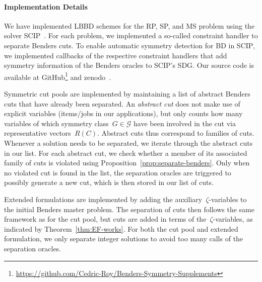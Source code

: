 \documentclass[a4paper,10pt]{article}
\newcommand{\solver}[1]{\textsc{#1}}
\newcommand{\scip}{\solver{SCIP}\xspace}
\newcommand{\rectanglepack}{RP\xspace}
\newcommand{\spherepack}{SP\xspace}
\newcommand{\scheduling}{MS\xspace}
\theoremstyle{definition}
\begin{document}
\paragraph{Implementation Details}
We have implemented LBBD schemes for the \rectanglepack, \spherepack, and \scheduling problem using the solver \scip~\cite{SCIP8}.
For each problem, we implemented a so-called constraint handler to separate Benders cuts.
To enable automatic symmetry detection for BD in \scip, we implemented callbacks of the respective constraint handlers that add symmetry information of the Benders oracles to \scip's SDG.
Our source code is available at GitHub\footnote{\url{https://github.com/Cedric-Roy/Benders-Symmetry-Supplements}} and zenodo~\cite{releaseBenders}.

Symmetric cut pools are implemented by maintaining a list of abstract Benders cuts that have already been separated.
An \emph{abstract cut} does not make use of explicit variables (items/jobs in our applications), but only counts how many variables of which symmetry class~$G\in\mathcal{G}$ have been involved in the cut via representative vectors~$R(C)$.
Abstract cuts thus correspond to families of cuts.
Whenever a solution needs to be separated, we iterate through the abstract cuts in our list.
For each abstract cut, we check whether a member of its associated family of cuts is violated using Proposition~\ref{prop:separate-benders}.
Only when no violated cut is found in the list, the separation oracles are triggered to possibly generate a new cut, which is then stored in our list of cuts.

Extended formulations are implemented by adding the auxiliary~$\zeta$-variables to the initial Benders master problem.
The separation of cuts then follows the same framework as for the cut pool, but cuts are added in terms of the~$\zeta$-variables, as indicated by Theorem~\ref{thm:EF-works}.
For both the cut pool and extended formulation, we only separate integer solutions to avoid too many calls of the separation oracles.
\end{document}
